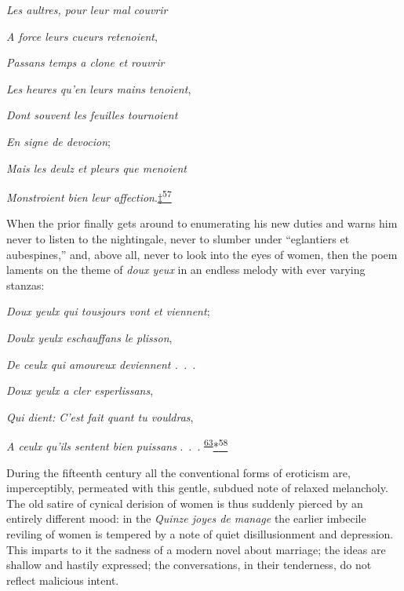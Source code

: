 \emph{Les aultres, pour leur mal couvrir}

\emph{A force leurs cueurs retenoient},

\emph{Passans temps a clone et rouvrir}

\emph{Les heures qu'en leurs mains tenoient},

\emph{Dont souvent les feuilles tournoient}

\emph{En signe de devocion};

\emph{Mais les deulz et pleurs que menoient}

\emph{Monstroient bien leur
affection}.\protect\hypertarget{21_Chapter_Thirteen__IMAGE_AND_WORD.xhtmlux5cux23id_2839}{\protect\hyperlink{23_NOTES.xhtmlux5cux23id_2840}{‡\textsuperscript{57}}}

When the prior finally gets around to enumerating his new duties and
warns him never to listen to the nightingale, never to slumber
\protect\hypertarget{21_Chapter_Thirteen__IMAGE_AND_WORD.xhtmlux5cux23page_372}{}{}under
``eglantiers et aubespines,'' and, above all, never to look into the
eyes of women, then the poem laments on the theme of \emph{doux yeux} in
an endless melody with ever varying stanzas:

\emph{Doux yeulx qui tousjours vont et viennent};

\emph{Doulx yeulx eschauffans le plisson},

\emph{De ceulx qui amoureux deviennent .~.~}.

\emph{Doux yeulx a cler esperlissans},

\emph{Qui dient: C'est fait quant tu vouldras},

\emph{A ceulx qu'ils sentent bien puissans} .~.~.
\textsuperscript{\protect\hypertarget{21_Chapter_Thirteen__IMAGE_AND_WORD.xhtmlux5cux23id_186}{\protect\hyperlink{23_NOTES.xhtmlux5cux23id_187}{63}}}\protect\hypertarget{21_Chapter_Thirteen__IMAGE_AND_WORD.xhtmlux5cux23id_2837}{\protect\hyperlink{23_NOTES.xhtmlux5cux23id_2838}{*\textsuperscript{58}}}

During the fifteenth century all the conventional forms of eroticism
are, imperceptibly, permeated with this gentle, subdued note of relaxed
melancholy. The old satire of cynical derision of women is thus suddenly
pierced by an entirely different mood: in the \emph{Quinze joyes de
manage} the earlier imbecile reviling of women is tempered by a note of
quiet disillusionment and depression. This imparts to it the sadness of
a modern novel about marriage; the ideas are shallow and hastily
expressed; the conversations, in their tenderness, do not reflect
malicious intent.

